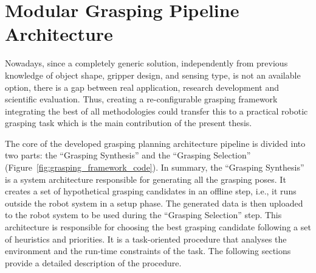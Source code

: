 \chapter{Modular Grasping Pipeline Architecture}
\label{cap4:modular_grasping_architecture}

Nowadays, since a completely generic solution, independently from previous knowledge of object shape, gripper design, and sensing type, is not an available option, there is a gap between real application, research development and scientific evaluation. Thus, creating a re-configurable grasping framework integrating the best of all methodologies could transfer this to a practical robotic grasping task which is the main contribution of the present thesis.

The core of the developed grasping planning architecture pipeline is divided into two parts: the ``Grasping Synthesis'' and the ``Grasping Selection'' (Figure~\ref{fig:grasping_framework_code}). In summary, the ``Grasping Synthesis'' is a system architecture responsible for generating all the grasping poses. It creates a set of  hypothetical grasping candidates in an offline step, i.e., it runs outside the robot system in a setup phase. The generated data is then uploaded to the robot system to be used during the ``Grasping Selection'' step. This architecture is responsible for choosing the best grasping candidate following a set of heuristics and priorities. It is a task-oriented procedure that analyses the environment and the run-time constraints of the task. The following sections provide a detailed description of the procedure.

